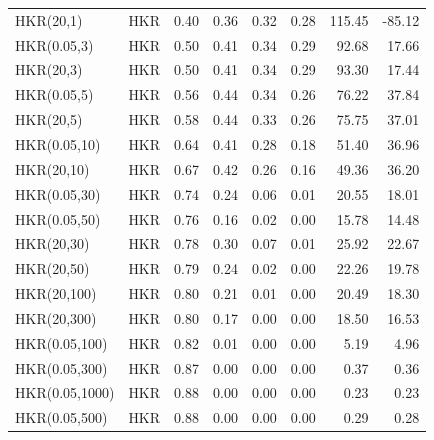 \begin{tabular}{llrrrrrr}
     HKR(20,1) &   HKR &      0.40 &         0.36 &         0.32 &          0.28 &        115.45 &         -85.12 \\
   HKR(0.05,3) &   HKR &      0.50 &         0.41 &         0.34 &          0.29 &         92.68 &          17.66 \\
     HKR(20,3) &   HKR &      0.50 &         0.41 &         0.34 &          0.29 &         93.30 &          17.44 \\
   HKR(0.05,5) &   HKR &      0.56 &         0.44 &         0.34 &          0.26 &         76.22 &          37.84 \\
     HKR(20,5) &   HKR &      0.58 &         0.44 &         0.33 &          0.26 &         75.75 &          37.01 \\
  HKR(0.05,10) &   HKR &      0.64 &         0.41 &         0.28 &          0.18 &         51.40 &          36.96 \\
    HKR(20,10) &   HKR &      0.67 &         0.42 &         0.26 &          0.16 &         49.36 &          36.20 \\
  HKR(0.05,30) &   HKR &      0.74 &         0.24 &         0.06 &          0.01 &         20.55 &          18.01 \\
  HKR(0.05,50) &   HKR &      0.76 &         0.16 &         0.02 &          0.00 &         15.78 &          14.48 \\
    HKR(20,30) &   HKR &      0.78 &         0.30 &         0.07 &          0.01 &         25.92 &          22.67 \\
    HKR(20,50) &   HKR &      0.79 &         0.24 &         0.02 &          0.00 &         22.26 &          19.78 \\
   HKR(20,100) &   HKR &      0.80 &         0.21 &         0.01 &          0.00 &         20.49 &          18.30 \\
   HKR(20,300) &   HKR &      0.80 &         0.17 &         0.00 &          0.00 &         18.50 &          16.53 \\
 HKR(0.05,100) &   HKR &      0.82 &         0.01 &         0.00 &          0.00 &          5.19 &           4.96 \\
 HKR(0.05,300) &   HKR &      0.87 &         0.00 &         0.00 &          0.00 &          0.37 &           0.36 \\
HKR(0.05,1000) &   HKR &      0.88 &         0.00 &         0.00 &          0.00 &          0.23 &           0.23 \\
 HKR(0.05,500) &   HKR &      0.88 &         0.00 &         0.00 &          0.00 &          0.29 &           0.28 \\

\end{tabular}
